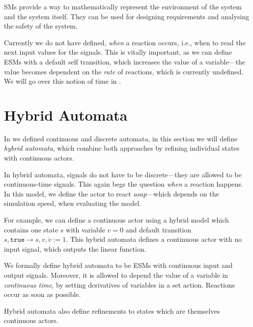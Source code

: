 SMs provide a way to mathematically represent the environment of the system and the system itself.
They can be used for designing requirements and analysing the safety of the system.

Currently we do not have defined, \emph{when} a reaction occurs, i.e., when to read the next input values for the signals.
This is vitally important, as we can define ESMs with a default self transition, which increases the value of a variable---the value becomes dependent on the \emph{rate} of reactions, which is currently undefined.
We will go over this notion of time in .

\newcommand{\true}{\texttt{true}}

\section{Hybrid Automata}
In  we defined continuous and discrete automata, in this section we will define \emph{hybrid automata}, which combine both approaches by refining individual states with continuous actors.

In hybrid automata, signals do not have to be discrete---they are allowed to be continuous-time signals.
This again begs the question \emph{when} a reaction happens.
In this model, we define the actor to react \emph{asap}---which depends on the simulation speed, when evaluating the model.

For example, we can define a continuous actor using a hybrid model which contains one state \(s\) with variable \(v = 0\) and default transition \(s, \true \rightarrow s, v, \dot v := 1\).
This hybrid automata defines a continuous actor with no input signal, which outputs the linear function.

\begin{definition}
    We formally define hybrid automata to be ESMs with continuous input and output signals.
    Moreover, it is allowed to depend the value of a variable in \emph{continuous time}, by setting derivatives of variables in a set action.
    Reactions occur as soon as possible.

    Hybrid automata also define refinements to states which are themselves continuous actors.
\end{definition}


